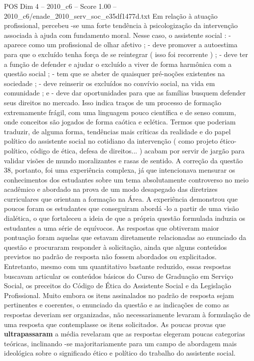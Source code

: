 \begin{textsample}{POS Dim 4 – 2010\_c6 – Score 1.00 – 2010\_c6/enade\_2010\_serv\_soc\_e35df1477d.txt}
Em relação à atuação profissional, percebeu -se uma forte tendência à psicologização da intervenção associada à ajuda com fundamento moral.
Nesse caso, o assistente social : - aparece como um profissional de olhar afetivo ; - deve promover a autoestima para que o excluído tenha força de se reintegrar ( isso foi recorrente ) ; - deve ter a função de defender e ajudar o excluído a viver de forma harmônica com a questão social ; - tem que se abster de quaisquer pré-noções existentes na sociedade ; - deve reinserir os excluídos no convívio social, na vida em comunidade ; e - deve dar oportunidades para que as famílias busquem defender seus direitos no mercado.
Isso indica traços de um processo de formação extremamente frágil, com uma linguagem pouco científica e de senso comum, onde conceitos são jogados de forma caótica e eclética.
Termos que poderiam traduzir, de alguma forma, tendências mais críticas da realidade e do papel político do assistente social no cotidiano da intervenção ( como projeto ético-político, código de ética, defesa de direitos... ) acabam por servir de jargão para validar visões de mundo moralizantes e rasas de sentido.
A correção da questão 38, portanto, foi uma experiência complexa, já que intencionava mensurar os conhecimentos dos estudantes sobre um tema absolutamente controverso no meio acadêmico e abordado na prova de um modo desapegado das diretrizes curriculares que orientam a formação na Área.
A experiência demonstrou que poucos foram os estudantes que conseguiram abordá -lo a partir de uma visão dialética, o que fortaleceu a ideia de que a própria questão formulada induzia os estudantes a uma série de equívocos.
As respostas que obtiveram maior pontuação foram aquelas que estavam diretamente relacionadas ao enunciado da questão e procuraram responder à solicitação, ainda que alguns conteúdos previstos no padrão de resposta não fossem abordados ou explicitados.
Entretanto, mesmo com um quantitativo bastante reduzido, essas respostas buscavam articular os conteúdos básicos do Curso de Graduação em Serviço Social, os preceitos do Código de Ética do Assistente Social e da Legislação Profissional.
Muito embora os itens assinalados no padrão de resposta sejam pertinentes e coerentes, o enunciado da questão e as indicações de como as respostas deveriam ser organizadas, não necessariamente levaram à formulação de uma resposta que contemplasse os itens solicitados.
As poucas provas que \textbf{ultrapassaram} a média revelaram que as respostas elegeram poucas categorias teóricas, inclinando -se majoritariamente para um campo de abordagem mais ideológica sobre o significado ético e político do trabalho do assistente social.

\end{textsample}

